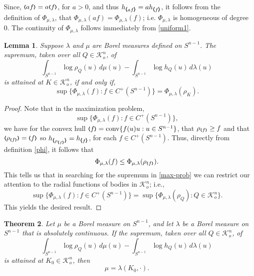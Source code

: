 \documentclass{cpamart1}     %
\newtheorem{theo}{Theorem}[section]
\newtheorem{lemm}[theo]{Lemma}
\theoremstyle{definition}
\theoremstyle{remark}
\newcommand{\sn}{S^{n-1}}
\newcommand{\kno}{\mathcal K^n_o}
\newcommand{\conv}{\operatorname{conv}}
\newcommand{\ee}{\mathcal E}
\newcommand{\bla}{\raise.2ex\hbox{$\scriptstyle\pmb \langle$}}
\newcommand{\sbla}{\raise.1ex\hbox{$\scriptscriptstyle\pmb \langle$}}
\newcommand{\bra}{\raise.2ex\hbox{$\scriptstyle\pmb \rangle$}}
\newcommand{\sbra}{\raise.1ex\hbox{$\scriptscriptstyle\pmb \rangle$}}
\begin{document}
Since, $\bla a f \bra = a \bla  f \bra$, for $a>0$, and thus
$h_{\bla a f \bra}=a h_{\bla f \bra}$, it follows from the definition of $\Phi_{\mu,\lambda}$,
that $\Phi_{\mu,\lambda}(af)=\Phi_{\mu,\lambda}(f)$; i.e. $\Phi_{\mu,\lambda}$ is homogeneous
of degree $0$.
The continuity of $\Phi_{\mu,\lambda}$ follows immediately from \eqref{uniform1}.




\begin{lemm} \label{MaxfK}
Suppose $\lambda$ and $\mu$ are Borel measures defined on $\sn$.
The supremum, taken over all $Q\in\kno$, of
\[
\int_{\sn} \log \rho_Q(u) \, d\mu(u) -  \int_{\sn} \log h_{Q}(u) \, d\lambda(u)
\]
is attained at $K\in\kno$, if and only if,
\[
\sup\{\Phi_{\mu,\lambda}(f): {f\in C^+(\sn)} \} = \Phi_{\mu,\lambda}(\rho_K).
\]
\end{lemm}

\begin{proof}
Note that in the maximization problem,
\begin{equation}\label{max-prob}
\sup\{\Phi_{\mu,\lambda}(f): {f\in C^+(\sn)} \},
\end{equation}
we have
for the convex hull ${\bla f \bra}=\conv\{ f(u)u : u\in\sn  \}$,
that $\rho_{{\sbla f \sbra}} \ge f$ and that $\bla {\rho_{{\sbla f \sbra}}} \bra = {\bla f \bra}$
so $h_{\bla {\rho_{{\sbla f \sbra}}} \bra} = h_{\bla f \bra}$, for each $f\in C^+(\sn)$.
Thus, directly from definition \eqref{phi}, it follows that
\[
\Phi_{\mu,\lambda}(f) \le \Phi_{\mu,\lambda}(\rho_{{\sbla f \sbra}}).
\]
This tells us that in searching for the supremum in \eqref{max-prob}
we can restrict our attention to the radial functions of bodies in $\kno$; i.e.,
\[
\sup\{\Phi_{\mu,\lambda}(f) : f\in C^+(\sn) \}=\sup\{\Phi_{\mu,\lambda}(\rho_Q) : Q\in\kno \}.
\]
This yields the desired result.
\end{proof}



\begin{theo}\label{f3}
Let $\mu$ be a Borel measure on $\sn$, and let
$\lambda$ be a Borel measure on $\sn$ that is absolutely continuous.
If the supremum, taken over all $Q\in\kno$, of
\[
\int_{\sn} \log \rho_Q(u) \, d\mu(u) -  \int_{\sn} \log h_{Q}(u) \, d\lambda(u)
\]
is attained at $K_0 \in \mathcal K_o^n$, then
\[
\mu=\lambda(K_0,\cdot).
\]
\end{theo}
\end{document}
